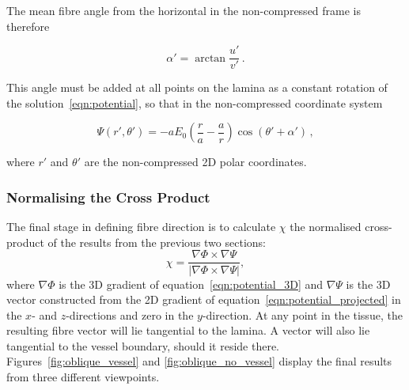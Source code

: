     The mean fibre angle from the horizontal in the non-compressed frame is therefore
    
    \begin{equation}
      \alpha' = \arctan \frac{u'}{v'}\,.
    \end{equation}
    
    This angle must be added at all points on the lamina as a constant rotation of the solution~\ref{eqn:potential}, so that in the non-compressed coordinate system
    
    \begin{equation}
      \Psi(r',\theta') = -aE_0 \left( \frac{r}{a} - \frac{a}{r} \right) \cos\left( \theta' + \alpha' \right)\,,
      \label{eqn:potential_projected}
    \end{equation}
    
    where $r'$ and $\theta'$ are the non-compressed 2D polar coordinates.
  
  \subsubsection{Normalising the Cross Product} %
  \label{sub:normalising_the_cross_product}
    The final stage in defining fibre direction is to calculate $\chi$ the normalised cross-product of the results from the previous two sections: 
    \begin{equation}
      \chi = \frac{\nabla\Phi \times \nabla\Psi}{\lvert\nabla\Phi \times \nabla\Psi\rvert},
    \end{equation}
      where $\nabla\Phi$ is the 3D gradient of equation~\ref{eqn:potential_3D} and $\nabla\Psi$ is the 3D vector constructed from the 2D gradient of equation~\ref{eqn:potential_projected} in the $x$- and $z$-directions and zero in the $y$-direction. At any point in the tissue, the resulting fibre vector will lie tangential to the lamina. A vector will also lie tangential to the vessel boundary, should it reside there. Figures~\ref{fig:oblique_vessel} and \ref{fig:oblique_no_vessel} display the final results from three different viewpoints.
    
